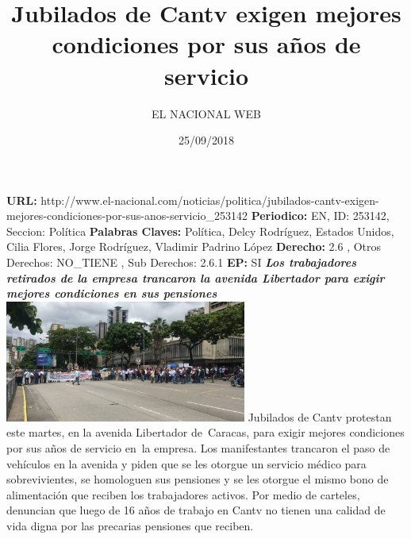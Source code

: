 \documentclass{article}%
\title{\textbf{Jubilados de Cantv exigen mejores condiciones por sus años de servicio}}%
\author{EL NACIONAL WEB}%
\date{25/09/2018}%
\begin{document}
%
\normalsize%
\maketitle%
\textbf{URL: }%
http://www.el{-}nacional.com/noticias/politica/jubilados{-}cantv{-}exigen{-}mejores{-}condiciones{-}por{-}sus{-}anos{-}servicio\_253142\newline%
%
\textbf{Periodico: }%
EN, %
ID: %
253142, %
Seccion: %
Política\newline%
%
\textbf{Palabras Claves: }%
Política, Delcy Rodríguez, Estados Unidos, Cilia Flores, Jorge Rodríguez, Vladimir Padrino López\newline%
%
\textbf{Derecho: }%
2.6%
, Otros Derechos: %
NO\_TIENE%
, Sub Derechos: %
2.6.1%
\newline%
%
\textbf{EP: }%
SI\newline%
\newline%
%
\textbf{\textit{Los trabajadores retirados de la empresa trancaron la avenida Libertador para exigir mejores condiciones en sus pensiones}}%
\newline%
\newline%
%
\includegraphics[width=300px]{102.jpg}%
\newline%
%
Jubilados de Cantv protestan este martes, en la avenida Libertador de~Caracas, para exigir mejores condiciones por sus años de servicio en~la empresa.%
\newline%
%
Los manifestantes trancaron el paso de vehículos en la avenida y piden que se les otorgue un servicio médico para sobrevivientes, se homologuen sus pensiones y se les otorgue el mismo bono de alimentación que reciben los trabajadores activos.%
\newline%
%
Por medio de carteles, denuncian que luego de 16 años de trabajo en Cantv no tienen una calidad de vida digna por las precarias pensiones que reciben.%
\newline%
%
\end{document}
